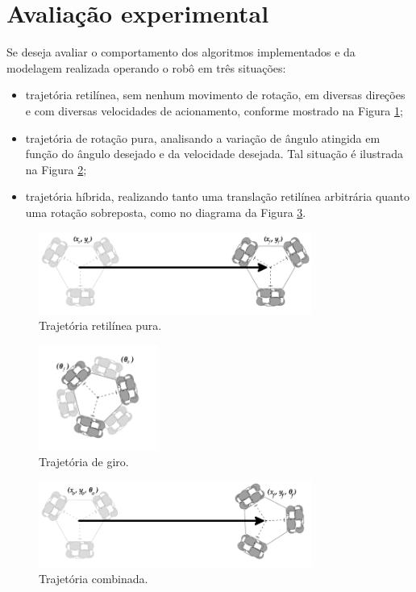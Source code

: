 \section{Avaliação experimental}
\label{sec:experimental}

Se deseja avaliar o comportamento dos algoritmos implementados e da modelagem realizada operando o robô em três situações:
\begin{itemize}
  \item{trajetória retilínea, sem nenhum movimento de rotação, em diversas direções e com diversas velocidades de acionamento, conforme mostrado na Figura \ref{fig:reta};}
  \item{trajetória de rotação pura, analisando a variação de ângulo atingida em função do ângulo desejado e da velocidade desejada. Tal situação é ilustrada na Figura \ref{fig:giro};}
  \item{trajetória híbrida, realizando tanto uma translação retilínea arbitrária quanto uma rotação sobreposta, como no diagrama da Figura \ref{fig:hibrida}.}
\end{itemize}

\begin{figure}[h]
  \centering
  \includegraphics[width = 0.8\textwidth]{imagens/reta}
  \caption{Trajetória retilínea pura.}
  \label{fig:reta}
\end{figure}

\begin{figure}[h]
  \centering
  \includegraphics[width = 0.35\textwidth]{imagens/giro}
  \caption{Trajetória de giro.}
  \label{fig:giro}
\end{figure}

\begin{figure}[h]
  \centering
  \includegraphics[width = 0.8\textwidth]{imagens/hibrida}
  \caption{Trajetória combinada.}
  \label{fig:hibrida}
\end{figure}

